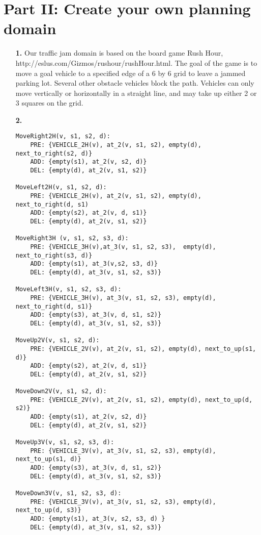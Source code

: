 \documentclass{article}
\begin{document}
\section{Part II: Create your own planning domain}
\begin{enumerate}

\item[\textbf{1.}]
Our traffic jam domain is based on the board game Rush Hour,
http://eslus.com/Gizmos/rushour/rushHour.html.  The goal of the game is
to move a goal vehicle to a specified edge of a 6 by 6 grid to
leave a jammed parking lot. Several other obstacle vehicles block the
path. Vehicles can only move vertically or horizontally in a straight
line, and may take up either 2 or 3 squares on the grid.

\item[\textbf{2.}]
\begin{verbatim}
MoveRight2H(v, s1, s2, d):
    PRE: {VEHICLE_2H(v), at_2(v, s1, s2), empty(d), next_to_right(s2, d)}
    ADD: {empty(s1), at_2(v, s2, d)}
    DEL: {empty(d), at_2(v, s1, s2)}

MoveLeft2H(v, s1, s2, d):
    PRE: {VEHICLE_2H(v), at_2(v, s1, s2), empty(d), next_to_right(d, s1)
    ADD: {empty(s2), at_2(v, d, s1)}
    DEL: {empty(d), at_2(v, s1, s2)}

MoveRight3H (v, s1, s2, s3, d):
    PRE: {VEHICLE_3H(v),at_3(v, s1, s2, s3),  empty(d), next_to_right(s3, d)}
    ADD: {empty(s1), at_3(v,s2, s3, d)}
    DEL: {empty(d), at_3(v, s1, s2, s3)}

MoveLeft3H(v, s1, s2, s3, d):
    PRE: {VEHICLE_3H(v), at_3(v, s1, s2, s3), empty(d), next_to_right(d, s1)}
    ADD: {empty(s3), at_3(v, d, s1, s2)}
    DEL: {empty(d), at_3(v, s1, s2, s3)}

MoveUp2V(v, s1, s2, d):
    PRE: {VEHICLE_2V(v), at_2(v, s1, s2), empty(d), next_to_up(s1, d)}
    ADD: {empty(s2), at_2(v, d, s1)}
    DEL: {empty(d), at_2(v, s1, s2)}

MoveDown2V(v, s1, s2, d):
    PRE: {VEHICLE_2V(v), at_2(v, s1, s2), empty(d), next_to_up(d, s2)}
    ADD: {empty(s1), at_2(v, s2, d)}
    DEL: {empty(d), at_2(v, s1, s2)}

MoveUp3V(v, s1, s2, s3, d):
    PRE: {VEHICLE_3V(v), at_3(v, s1, s2, s3), empty(d), next_to_up(s1, d)}
    ADD: {empty(s3), at_3(v, d, s1, s2)}
    DEL: {empty(d), at_3(v, s1, s2, s3)}

MoveDown3V(v, s1, s2, s3, d):
    PRE: {VEHICLE_3V(v), at_3(v, s1, s2, s3), empty(d), next_to_up(d, s3)}
    ADD: {empty(s1), at_3(v, s2, s3, d) }
    DEL: {empty(d), at_3(v, s1, s2, s3)}
\end{verbatim}


\end{enumerate}
\end{document}
